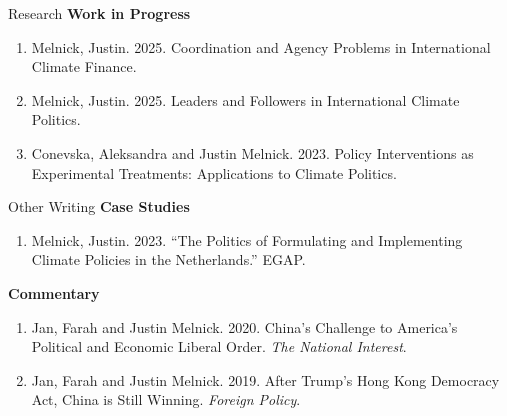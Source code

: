 \documentclass{resume} %
\begin{document}
\begin{rSection}{Research}
\textbf{Work in Progress}
\begin{enumerate}
\item Melnick, Justin. 2025. Coordination and Agency Problems in International Climate Finance.
\item Melnick, Justin. 2025. Leaders and Followers in International Climate Politics.
    \item Conevska, Aleksandra and Justin Melnick. 2023. Policy Interventions as Experimental Treatments: Applications to Climate Politics.
\end{enumerate}

\end{rSection}

\begin{rSection}{Other Writing}
\textbf{Case Studies}
\begin{enumerate}
\item Melnick, Justin. 2023. ``The Politics of Formulating and Implementing Climate Policies in the Netherlands.'' EGAP.
\end{enumerate}

\newpage

\textbf{Commentary}
    \begin{enumerate}
    \item   Jan, Farah and Justin Melnick. 2020. China's Challenge to America's Political and Economic Liberal Order. \textit{The National Interest}.
    \item    Jan, Farah and Justin Melnick. 2019. After Trump's Hong Kong Democracy Act, China is Still Winning. \textit{Foreign Policy}.
\end{enumerate}
\end{rSection}
\end{document}
